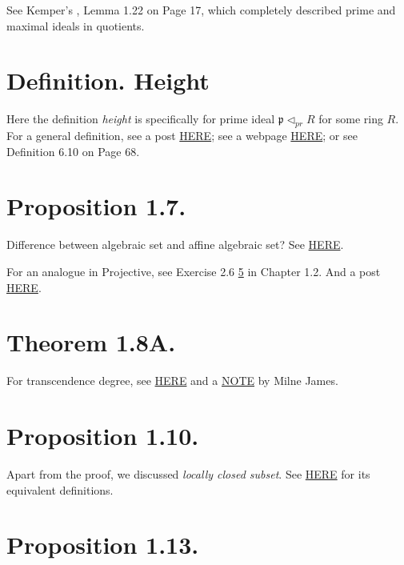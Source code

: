 See Kemper's \cite{kemper2011course}, Lemma 1.22 on Page 17, which completely described prime and maximal ideals in quotients.

\section{Definition. Height}

Here the definition \textit{height} is specifically for prime ideal $\mathfrak p \vartriangleleft_{pr} R$ for some ring $R$. For a general definition, see a post \href{https://math.stackexchange.com/questions/2689141/definition-of-height-of-an-ideal}{HERE}; see a webpage \href{https://encyclopediaofmath.org/wiki/Height_of_an_ideal}{HERE}; or see \cite{kemper2011course} Definition 6.10 on Page 68.

\section{Proposition 1.7.}

Difference between algebraic set and affine algebraic set? See \href{https://math.stackexchange.com/questions/3486407/difference-between-algebraic-set-and-affine-algebraic-set-in-hartshorne}{HERE}.

For an analogue in Projective, see Exercise 2.6 \ref{} in Chapter 1.2. And a post \href{https://math.stackexchange.com/questions/670156/hartshorne-exercise-2-6}{HERE}.

\section{Theorem 1.8A.}

For transcendence degree, see \href{https://en.wikipedia.org/wiki/Transcendental_extension#CITEREFMilne}{HERE} and a \href{https://www.jmilne.org/math/CourseNotes/FT.pdf}{NOTE} by Milne James.

\section{Proposition 1.10.}

Apart from the proof, we discussed \textit{locally closed subset}.
See \href{https://en.wikipedia.org/wiki/Locally_closed_subset}{HERE} for its equivalent definitions.

\section{Proposition 1.13.}

